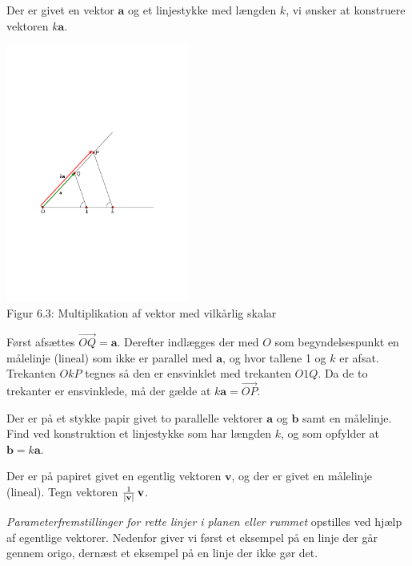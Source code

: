 \begin{example}
Der er givet en vektor $\mathbf a$ og et linjestykke med længden $k$, vi ønsker at konstruere vektoren $k\mathbf a$. 
\begin{center}
		\includegraphics[trim=4cm 10cm 6cm 10.5cm,width=0.45\textwidth,clip]{geometer/vektor4.pdf}\\Figur 6.3: Multiplikation af vektor med vilkårlig skalar				
\end{center}
Først afsættes $\stackrel{\rightarrow}{OQ}=\mathbf a$. Derefter indlægges der med $O$ som begyndelsespunkt en målelinje (lineal) som ikke er parallel med $\mathbf a$, og hvor tallene 1 og $k$ er afsat. Trekanten $OkP$ tegnes så den er ensvinklet med trekanten $O1Q$. Da de to trekanter er ensvinklede, må der gælde at $k\mathbf a=\stackrel{\rightarrow}{OP}$.
\end{example}
\begin{exercise}
Der er på et stykke papir givet to parallelle vektorer $\mathbf a$ og $\mathbf b$ samt en målelinje. Find ved konstruktion et linjestykke som har længden $k$, og som opfylder at $\mathbf b=k\mathbf a$. 
\end{exercise}
\begin{exercise}
Der er på papiret givet en egentlig vektoren $\mathbf v$, og der er givet en målelinje (lineal). Tegn vektoren $\frac 1 {|\mathbf{v}|}\,\mathbf{v}$. 
\end{exercise}
\textit{Parameterfremstillinger for rette linjer i planen eller rummet} opstilles ved hjælp af egentlige vektorer. Nedenfor giver vi først et eksempel på en linje der går gennem origo, dernæst et eksempel på en linje der ikke gør det.

